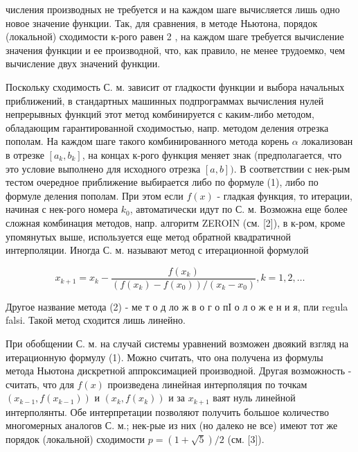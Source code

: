 \documentclass[10pt]{article}
\begin{document}
числения производных не требуется и на каждом шаге вычисляется лишь одно новое значение функции. Так, для сравнения, в методе Ньютона, порядок (локальной) сходимости к-рого равен 2 , на каждом шаге требуется вычисление значения функции и ее производной, что, как правило, не менее трудоемко, чем вычисление двух значений функции.



Поскольку сходимость С. м. зависит от гладкости функции и выбора начальных приближений, в стандартных машинных подпрограммах вычисления нулей непрерывных функций этот метод комбинируется с каким-либо методом, обладающим гарантированной сходимостью, напр. методом деления отрезка пополам. На каждом шаге такого комбинированного метода корень $\alpha$ локализован в отрезке $\left[a_{k}, b_{k}\right]$, на концах к-рого функция меняет знак (предполагается, что это условие выполнено для исходного отрезка $[a, b])$. В соответствии с нек-рым тестом очередное приближение выбирается либо по формуле (1), либо по формуле деления пополам. При этом если $f(x)$ - гладкая функция, то итерации, начиная с нек-рого номера $k_{0}$, автоматически идут по С. м. Возможна еще более сложная комбинация методов, напр. алгоритм ZEROIN (см. [2]), в к-ром, кроме упомянутых выше, используется еще метод обратной квадратичной интерполяции. Иногда С. м. называют метод с итерационной формулой



\[

x_{k+1}=x_{k}-\frac{f\left(x_{k}\right)}{\left(f\left(x_{k}\right)-f\left(x_{0}\right)\right) /\left(x_{k}-x_{0}\right)}, k=1,2, \ldots

\]



Другое название метода (2) - ме т о д ло ж в о г о пІ о л о ж е н и я, пли regula falsi. Такой метод сходится лишь линейно.



При обобщении С. м. на случай системы уравнений возможен двоякий взгляд на итерационную формулу (1). Можно считать, что она получена из формулы метода Ньютона дискретной аппроксимацией производной. Другая возможность - считать, что для $f(x)$ произведена линейная интерполяция по точкам $\left(x_{k-1}, f\left(x_{k-1}\right)\right)$ и $\left(x_{k}, f\left(x_{k}\right)\right)$ и за $x_{k+1}$ ваят нуль линейной интерполянты. Обе интерпретации позволяют получить большое количество многомерных аналогов С. м.; нек-рые из них (но далеко не все) имеют тот же порядок (локальной) сходимости $p=(1+\sqrt{5}) / 2$ (см. [3]).
\end{document}
